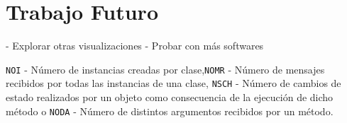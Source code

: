 \par 

\section{Trabajo Futuro}

\par 
- Explorar otras visualizaciones
- Probar con más softwares

{\tt NOI} - Número de instancias creadas por clase,{\tt NOMR} - Número de mensajes recibidos por todas las instancias de una clase, {\tt NSCH} - Número de cambios de estado realizados por un objeto como consecuencia de la ejecución de dicho método o {\tt NODA} - Número de distintos argumentos recibidos por un método. 


